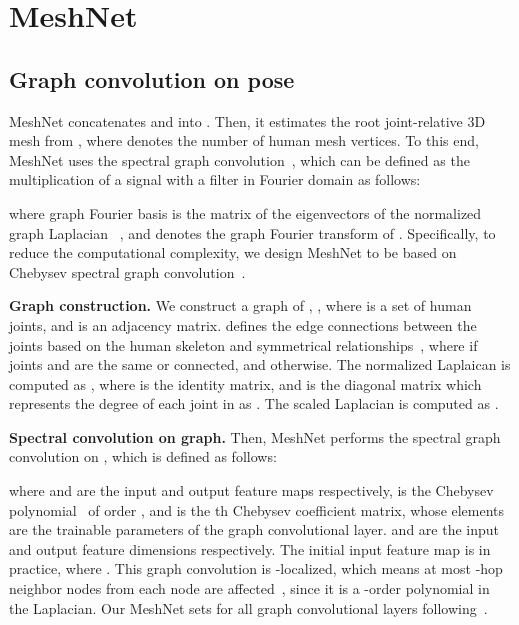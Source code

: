 \documentclass[runningheads]{llncs}
\begin{document}
\vspace{-2mm}
\section{MeshNet}
\vspace{-2mm}

\subsection{Graph convolution on pose}
MeshNet concatenates  and  into .
Then, it estimates the root joint-relative 3D mesh  from , where  denotes the number of human mesh vertices.
To this end, MeshNet uses the spectral graph convolution~\cite{shuman2013gsp,joan2014spect}, which can be defined as the multiplication of a signal  with a filter  in Fourier domain as follows:

where graph Fourier basis  is the matrix of the eigenvectors of the normalized graph Laplacian ~\cite{chung1997spectgraph}, and  denotes the graph Fourier transform of .
Specifically, to reduce the computational complexity, we design MeshNet to be based on Chebysev spectral graph convolution~\cite{defferrard2016chebygcn}. 


\smallbreak
\noindent \textbf{Graph construction.}
We construct a graph of ,  , where  is a set of  human joints, and  is an adjacency matrix.
 defines the edge connections between the joints based on the human skeleton and symmetrical relationships~\cite{cai2019temp_gcn}, where  if joints  and  are the same or connected, and  otherwise.
The normalized Laplaican is computed as , where  is the identity matrix, and  is the diagonal matrix which represents the degree of each joint in  as .
The scaled Laplacian is computed as .

\smallbreak
\noindent \textbf{Spectral convolution on graph.}
Then, MeshNet performs the spectral graph convolution on , which is defined as follows:


where  and  are the input and output feature maps respectively,  is the Chebysev polynomial~\cite{hammond2009wavelet} of order , and  is the th Chebysev coefficient matrix, whose elements are the trainable parameters of the graph convolutional layer.
 and  are the input and output feature dimensions respectively.
The initial input feature map   is  in practice, where .
This graph convolution is -localized, which means at most -hop neighbor nodes from each node are affected~\cite{defferrard2016chebygcn,kipf2017gcn}, since it is a -order polynomial in the Laplacian.
Our MeshNet sets  for all graph convolutional layers following~\cite{ge2019handgcn}.
\end{document}
